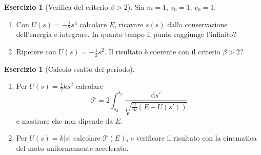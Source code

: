 \documentclass[11pt, a4paper, openright]{book}
\theoremstyle{plain}
\theoremstyle{definition}
\newtheorem{esercizio}[teorema]{Esercizio}
\theoremstyle{remark}
\begin{document}
\begin{esercizio}[Verifica del criterio $\beta > 2$]\label{es:mu7}
    Sia $m = 1$, $s_0 = 1$, $v_0 = 1$.
    \begin{enumerate}[label=(\alph*)]
        \item Con $U(s) = -\frac{1}{2}s^4$ calcolare $E$, ricavare $\dot{s}(s)$ dalla conservazione dell'energia e integrare. In quanto tempo il punto raggiunge l'infinito?
        \item Ripetere con $U(s) = -\frac{1}{2}s^2$. Il risultato è coerente con il criterio $\beta > 2$?
    \end{enumerate}
\end{esercizio}

\begin{esercizio}[Calcolo esatto del periodo]\label{es:mu8}
    \begin{enumerate}[label=(\alph*)]
        \item Per $U(s) = \frac{1}{2}ks^2$ calcolare
        \begin{equation}
            \mathcal{T} = 2\int_{s_2}^{s_3} \frac{\mathrm{d}s'}{\sqrt{\frac{2}{m}(E - U(s'))}}
        \end{equation}
        e mostrare che non dipende da $E$.
        \item Per $U(s) = k|s|$ calcolare $\mathcal{T}(E)$, e verificare il risultato con la cinematica del moto uniformemente accelerato.
    \end{enumerate}
\end{esercizio}
\end{document}
